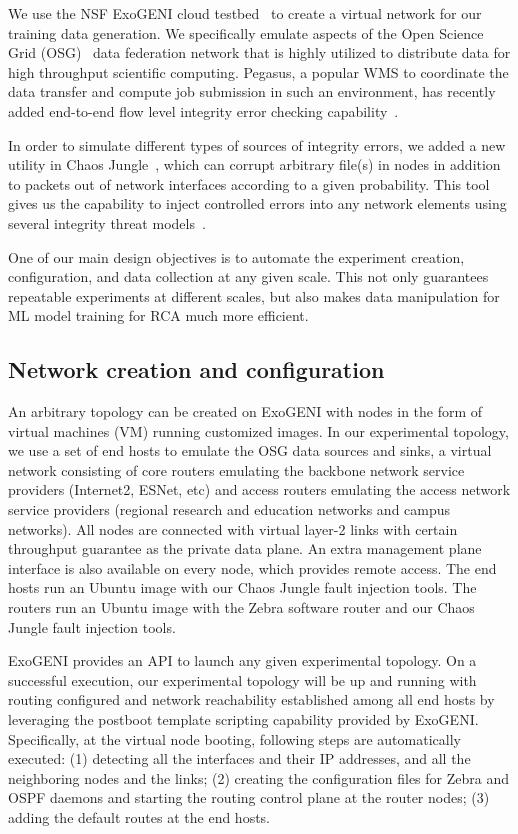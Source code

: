 We use the NSF ExoGENI cloud testbed~\cite{ExoGENI:web} to create a virtual network for our training data generation. We specifically emulate aspects of the Open Science Grid (OSG)~\cite{OSG:web} data federation network that is highly utilized to distribute data for high throughput scientific computing. Pegasus, a popular WMS to coordinate the data transfer and compute job submission in such an environment, has recently added end-to-end flow level integrity error checking capability~\cite{swip:pearc:2019}.    

In order to simulate different types of sources of integrity errors, we added a new utility in Chaos Jungle~\cite{swip:pearc:2019,chaosjungle:web}, which can corrupt arbitrary file(s) in nodes in addition to packets out of network interfaces according to a given probability. This tool gives us the capability to inject controlled errors into any network elements using several integrity threat models~\cite{threat-model}.

One of our main design objectives is to automate the experiment creation, configuration, and data collection at any given scale. This not only guarantees repeatable experiments at different scales, but also makes data manipulation for ML model training for RCA much more efficient.    

\subsection{Network creation and configuration}
An arbitrary topology can be created on ExoGENI with nodes in the form of virtual machines (VM) running customized images. In our experimental topology, we use a set of end hosts to emulate the OSG data sources and sinks, a virtual network consisting of core routers emulating the backbone network service providers (Internet2, ESNet, etc) and access routers emulating the access network service providers (regional research and education networks and campus networks). All nodes are connected with virtual layer-2 links with certain throughput guarantee as the private data plane. An extra management plane interface is also available on every node, which provides remote access. The end hosts run an Ubuntu image with our Chaos Jungle fault injection tools. The routers run an Ubuntu image with the Zebra software router and our Chaos Jungle fault injection tools.

ExoGENI provides an API to launch any given experimental topology. On a successful execution, our experimental topology will be up and running with routing configured and network reachability established among all end hosts by leveraging the postboot template scripting capability provided by ExoGENI. Specifically, at the virtual node booting, following steps are automatically executed: (1) detecting all the interfaces and their IP addresses, and all the neighboring nodes and the links; (2) creating the configuration files for Zebra and OSPF daemons and starting the routing control plane at the router nodes; (3) adding the default routes at the end hosts.    

